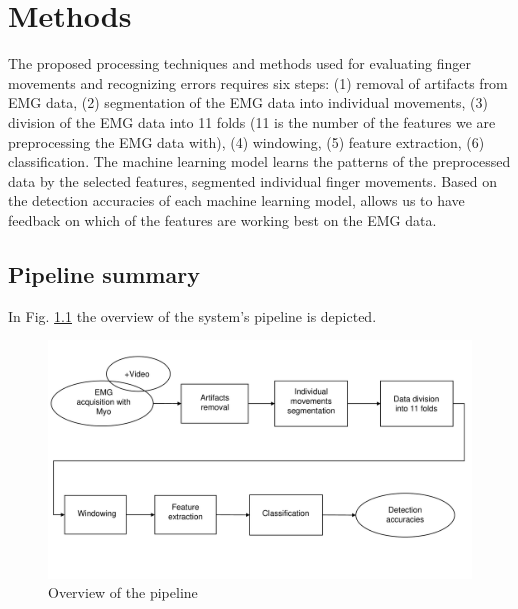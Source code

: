 \chapter{Methods}
The proposed processing techniques and methods used for evaluating finger movements and recognizing errors requires six steps:  (1) removal of artifacts from \ac{EMG} data, (2) segmentation of the \ac{EMG} data into individual movements, (3) division of the \ac{EMG} data into 11 folds (11 is the number of the features we are preprocessing the EMG data with), (4) windowing, (5) feature extraction, (6) classification. The machine learning model learns the patterns of the preprocessed data by the selected features, segmented individual finger movements. Based on the detection accuracies of each machine learning model, allows us to have feedback on which of the features are working best on the \ac{EMG} data.\\
\section{Pipeline summary}
In Fig. \ref{fig:pipeline_summary} the overview of the system's pipeline is depicted. \\
\begin{figure}[h!]
\includegraphics[width=15cm,left,keepaspectratio]{figures/pipeline_summary.pdf}
\caption{Overview of the pipeline}
\label{fig:pipeline_summary}
\end{figure}
